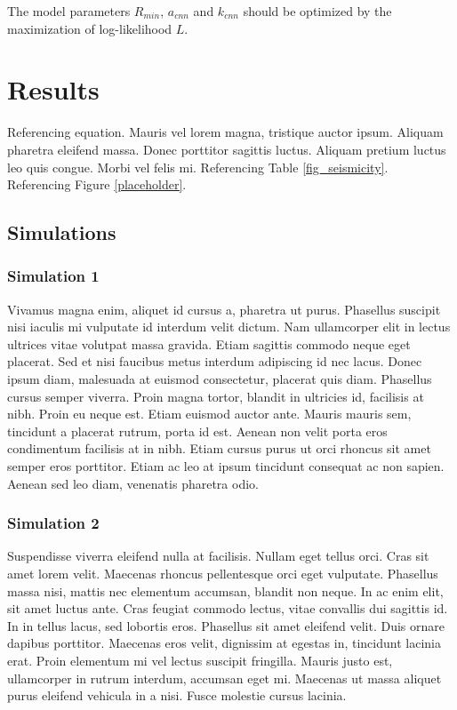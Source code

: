 \documentclass[draft, grl]{agutex}
\begin{document}
\begin{article}
The model parameters $R_{min}$, $a_{cnn}$ and $k_{cnn}$ should be optimized by the maximization of log-likelihood $L$.



\section{Results}

Referencing equation. Mauris vel lorem magna, tristique auctor ipsum. Aliquam pharetra eleifend massa. Donec porttitor sagittis luctus. Aliquam pretium luctus leo quis congue. Morbi vel felis mi. Referencing Table \ref{fig_seismicity}. Referencing Figure \ref{placeholder}.

\subsection{Simulations}

\subsubsection{Simulation 1}

Vivamus magna enim, aliquet id cursus a, pharetra ut purus. Phasellus suscipit nisi iaculis mi vulputate id interdum velit dictum. Nam ullamcorper elit in lectus ultrices vitae volutpat massa gravida. Etiam sagittis commodo neque eget placerat. Sed et nisi faucibus metus interdum adipiscing id nec lacus. Donec ipsum diam, malesuada at euismod consectetur, placerat quis diam. Phasellus cursus semper viverra. Proin magna tortor, blandit in ultricies id, facilisis at nibh. Proin eu neque est. Etiam euismod auctor ante. Mauris mauris sem, tincidunt a placerat rutrum, porta id est. Aenean non velit porta eros condimentum facilisis at in nibh. Etiam cursus purus ut orci rhoncus sit amet semper eros porttitor. Etiam ac leo at ipsum tincidunt consequat ac non sapien. Aenean sed leo diam, venenatis pharetra odio.

\subsubsection{Simulation 2}

Suspendisse viverra eleifend nulla at facilisis. Nullam eget tellus orci. Cras sit amet lorem velit. Maecenas rhoncus pellentesque orci eget vulputate. Phasellus massa nisi, mattis nec elementum accumsan, blandit non neque. In ac enim elit, sit amet luctus ante. Cras feugiat commodo lectus, vitae convallis dui sagittis id. In in tellus lacus, sed lobortis eros. Phasellus sit amet eleifend velit. Duis ornare dapibus porttitor. Maecenas eros velit, dignissim at egestas in, tincidunt lacinia erat. Proin elementum mi vel lectus suscipit fringilla. Mauris justo est, ullamcorper in rutrum interdum, accumsan eget mi. Maecenas ut massa aliquet purus eleifend vehicula in a nisi. Fusce molestie cursus lacinia.


\end{article}
\end{document}
